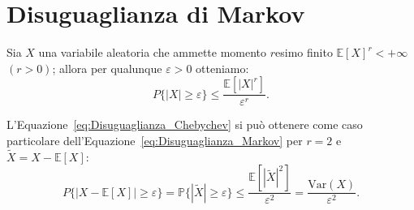     \section{Disuguaglianza di Markov}
        \begin{defn}
            Sia $X$ una variabile aleatoria che ammette momento $r$\nbdash esimo finito $\mathbb{E}[X]^r<+\infty$ $(r>0)$; allora per qualunque $\varepsilon > 0$ otteniamo:
            \begin{equation}\label{eq:Disuguaglianza_Markov}
                P\{|X|\geq \varepsilon\} \leq \frac{\mathbb{E}[|X|^r]}{\varepsilon^r}
            .\end{equation}
        \end{defn}
        \begin{obsv}
            L'Equazione~\ref{eq:Disuguaglianza_Chebychev} si può ottenere come caso particolare dell'Equazione~\ref{eq:Disuguaglianza_Markov} per $r=2$ e $\tilde{X}=X-\mathbb{E}[X]$: \[
                P\{|X - \mathbb{E}[X]| \geq \varepsilon\} = \mathbb{P}\{|\tilde{X}| \geq \varepsilon\} \leq \frac{\mathbb{E}[|\tilde{X}|^2]}{\varepsilon^2} = \frac{\text{Var}(X)}{\varepsilon^2}
            .\] 
        \end{obsv}
